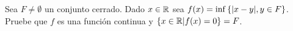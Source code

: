 
Sea $F\neq\emptyset$ un conjunto cerrado. Dado $x\in\mathbb{R}$ sea $f(x) = \inf\left\{|x-y|, y\in F\right\}$. Pruebe que $f$ es una función continua y $\left\{x\in\mathbb{R}|f(x) = 0\right\} = F$.